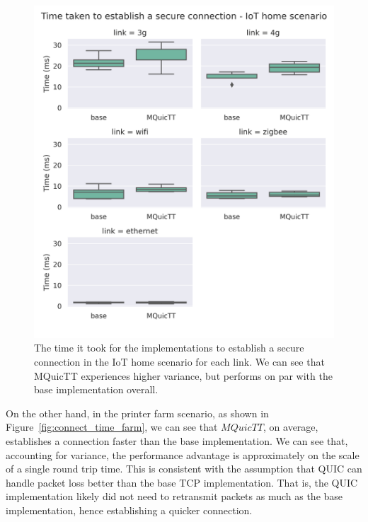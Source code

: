 \begin{figure}
    \centering
    \includegraphics[width=1\linewidth]{images/analysis_connection_time_home.png}
    \caption{The time it took for the implementations to establish a secure connection in the IoT home scenario for each link.
        We can see that MQuicTT experiences higher variance, but performs on par with the base implementation overall.}
    \label{fig:connect_time_home}
\end{figure}


On the other hand, in the printer farm scenario, as shown in Figure~\ref{fig:connect_time_farm}, we can see that $MQuicTT$, on average, establishes a connection faster than the base implementation.
We can see that, accounting for variance, the performance advantage is approximately on the scale of a single round trip time.
This is consistent with the assumption that QUIC can handle packet loss better than the base TCP implementation.
That is, the QUIC implementation likely did not need to retransmit packets as much as the base implementation, hence establishing a quicker connection.

